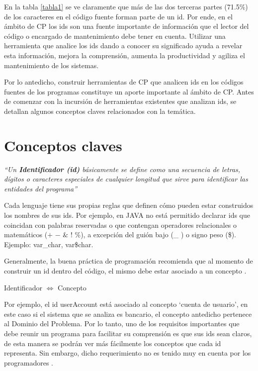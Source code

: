 \vspace{-2.5em}

En la tabla \ref{tabla1} se ve claramente que más de las dos terceras partes (71.5\%) de los caracteres en el código fuente forman parte de un id. 
Por ende, en el ámbito de CP los ids son una fuente importante de información que el lector del código o encargado de mantenimiento debe tener en cuenta. Utilizar una herramienta que analice los ids dando a conocer su significado ayuda a revelar esta información, mejora la comprensión, aumenta la productividad y agiliza el mantenimiento de los sistemas.

Por lo antedicho, construir herramientas de CP que analicen ids en los códigos fuentes de los programas constituye un aporte importante al ámbito de CP. Antes de comenzar con la incursión de herramientas existentes que analizan ids, se detallan algunos conceptos claves relacionados con la temática.

\section{Conceptos claves}

\textit{“Un \textbf{Identificador (id)} básicamente se define como una secuencia de letras, dígitos o caracteres especiales de cualquier longitud que sirve para identificar las entidades del programa”}
 
Cada lenguaje tiene sus propias reglas que definen cómo pueden estar construidos los nombres de sus ids. Por ejemplo, en JAVA no está permitido declarar ids que coincidan con palabras reservadas o que contengan operadores relacionales o matemáticos ($+$ $-$ $\&$ $!$ $\%$), a excepción del guión bajo (\_ ) o signo peso (\$). Ejemplo: \textsf{var\_char, var\$char}.

Generalmente, la buena práctica de programación recomienda que al momento de construir un id dentro del código, el mismo debe estar asociado a un concepto \cite{DFPM05,DMDJ13,LDFHB07}.

\begin{center}
\textsf{Identificador $\Leftrightarrow$ Concepto}
\end{center}

Por ejemplo, el id \textsf{userAccount} está asociado al concepto `cuenta de usuario', en este caso si el sistema que se analiza es bancario, el concepto antedicho pertenece al Dominio del Problema. Por lo tanto, uno de los requisitos importantes que debe reunir un programa para facilitar su comprensión es que sus ids sean claros, de esta manera se podrán ver más fácilmente los conceptos que cada id representa. Sin embargo, dicho requerimiento no es tenido muy en cuenta por los programadores \cite{DFPM05,DLHD06,DCHD06,LDFHB07}.

